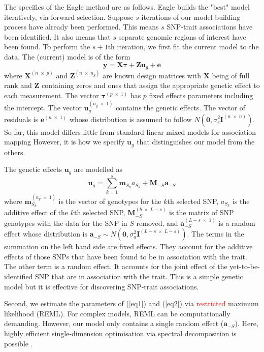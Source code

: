 \documentclass{bioinfo}
\newcommand{\bu}{\bm{u}}
\newcommand{\be}{\bm{e}}
\newcommand{\btau}{\bm{\tau}}
\newcommand{\ba}{\bm{a}}
\newcommand{\bzero}{\bm{0}}
\newcommand{\bI}{\bm{I}}
\newcommand{\bX}{\bm{X}}
\newcommand{\by}{\bm{y}}
\newcommand{\bZ}{\bm{Z}}
\newcommand{\bM}{\bm{M}}
\newcommand{\bmm}{\bm{m}}
\begin{document}
The specifics of the Eagle method are as follows. 
Eagle builds the "best" model iteratively, via forward selection. 
Suppose $s$ iterations of our model building process have already been performed. This means $s$ SNP-trait 
associations have been identified.  It also means that $s$ separate genomic regions of interest have been found.  
To perform the $s+1$th  iteration, we first fit the current model to the data. 
The (current) model is of the form 
\begin{equation}
\label{eq1}
\by = \bX \btau + \bZ \bu_g + \be
\end{equation}
where 
$\bX^{(n \; \times \; p)}$ and $\bZ^{( n \; \times \; n_g)}$ are known design matrices with $\bX$ being of full rank and $\bZ$ 
containing zeros and ones that assign the appropriate genetic effect to each measurement. 
The vector 
$\btau^{(p \; \times \; 1)}$ has $p$ fixed effects parameters including the intercept. The vector 
$\bu_g^{(n_g \; \times \; 1)}$ contains the 
genetic effects. The vector of residuals is 
$\be^{(n \; \times \;1)}$ whose distribution is assumed to follow $N(\bzero, \sigma^2_e \bI^{(n \; \times \; n)})$. 
So far,  this model differs little from standard linear mixed models for association mapping \citep{yu2006unified,zhao2007arabidopsis} 
However, 
it is how we specify $\bu_g$ that distinguishes our model from the others. 

The genetic effects $\bu_g$ are modelled as 
\begin{equation}
\label{eq2}
\bu_g = \sum_{k=1}^s  \bmm_{S_k} a_{S_k} +\bM_{-S} \ba_{-S}
\end{equation}
where $\bmm_{S_k}^{(n_g \; \times \; 1)}$ is the vector of genotypes for the  $k$th selected SNP, 
$a_{S_k}$ is the additive effect of the $k$th selected SNP, $\bM_{-S}^{(b \; \times \; L-s)}$ is the matrix of  SNP genotypes 
with the data for the SNP in $S$ removed,  and $\ba_{-S}^{(L-s \; \times  \; 1)}$ is a random effect whose distribution is 
$\ba_{-S} \sim N(\bzero, \sigma_a^2 \bI^{(L-s \; \times \;  L-s)})$. 
The terms in the summation on the left hand side are fixed effects.   They account 
for the additive effects of those SNPs that have been found to be in association with the trait. The other term is a random effect. 
It accounts for the joint effect of the yet-to-be-identified SNP that are in association with the trait. 
This is a simple genetic model but it 
is effective for discovering SNP-trait associations. 


Second, we estimate the parameters of (\ref{eq1}) and (\ref{eq2}) via \textcolor{red}{restricted} maximum likelihood (REML).  For complex models, REML
can be computationally demanding. However, our model only contains a single random effect ($\ba_{-S}$). Here, highly efficient single-dimension 
optimisation via spectral decomposition is possible \citep{kang2008efficient}. 
\end{document}
